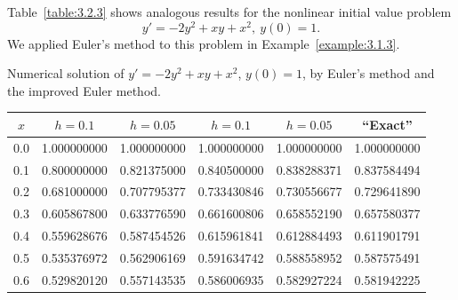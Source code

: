 \setcounter{example}{2}
\begin{example}
  \label{example:3.2.3} \rm Table~\ref{table:3.2.3} shows analogous results for the nonlinear
  initial value problem
  \[
    y'=-2y^{2}+xy+x^{2},\ y(0)=1.
  \]
  We applied Euler's method to this problem in Example~\ref{example:3.1.3}.
\end{example}
\setcounter{table}{2}
\begin{examplesolution}
\begin{newtable}
  \label{table:3.2.3} Numerical solution of $y'=-2y^{2}+xy+x^{2}$, $y(0)=1$, by Euler's method and
  the improved Euler method.
  \begin{center}
    \begin{tabular}{|c|r|r|r|r|r|}
      \hline
      \multicolumn{1}{|c|}{$x$} & \multicolumn{1}{|c|}{$h=0.1$} & \multicolumn{1}{|c|}{$h=0.05$}      & \multicolumn{1}{|c|}{$h=0.1$} & \multicolumn{1}{|c|}{$h=0.05$} & \multicolumn{1}{|c|}{``Exact''} \\
      \hline
      0.0                       & 1.000000000                   & 1.000000000                         & 1.000000000                   & 1.000000000                    & 1.000000000                     \\
      0.1                       & 0.800000000                   & 0.821375000                         & 0.840500000                   & 0.838288371                    & 0.837584494                     \\
      0.2                       & 0.681000000                   & 0.707795377                         & 0.733430846                   & 0.730556677                    & 0.729641890                     \\
      0.3                       & 0.605867800                   & 0.633776590                         & 0.661600806                   & 0.658552190                    & 0.657580377                     \\
      0.4                       & 0.559628676                   & 0.587454526                         & 0.615961841                   & 0.612884493                    & 0.611901791                     \\
      0.5                       & 0.535376972                   & 0.562906169                         & 0.591634742                   & 0.588558952                    & 0.587575491                     \\
      0.6                       & 0.529820120                   & 0.557143535                         & 0.586006935                   & 0.582927224                    & 0.581942225                     \\

\end{tabular}
\end{center}
\end{newtable}
\end{examplesolution}
